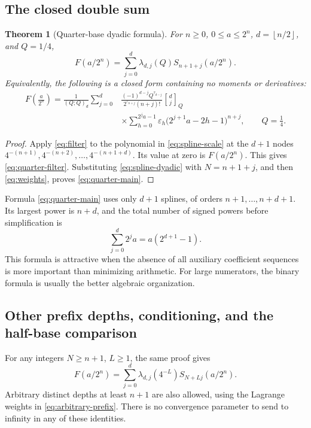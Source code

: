 \documentclass[11pt,a4paper]{article}
\newtheorem{theorem}{Theorem}[section]
\theoremstyle{definition}
\theoremstyle{remark}
\newcommand{\eps}{\varepsilon}
\newcommand{\qbinom}[3]{\genfrac{[}{]}{0pt}{}{#1}{#2}_{#3}}
\newcommand{\floor}[1]{\left\lfloor #1\right\rfloor}
\begin{document}
\subsection{The closed double sum}
\begin{theorem}[Quarter-base dyadic formula]
For \(n\geq0\), \(0\leq a\leq2^n\), \(d=\floor{n/2}\), and \(Q=1/4\),
\begin{equation}
 F(a/2^n)=\sum_{j=0}^{d}\lambda_{d,j}(Q)
                     S_{n+1+j}(a/2^n).                 \label{eq:quarter-filter}
\end{equation}
Equivalently, the following is a closed form containing no moments or derivatives:
\begin{equation}
 \boxed{\begin{aligned}
 F\!\left(\frac a{2^n}\right)
 =\frac1{(Q;Q)_d}\sum_{j=0}^{d}
 &\frac{(-1)^{d-j}Q^{\tau_{d-j}}}{2^{\tau_{n+j}}(n+j)!}
       \qbinom{d}{j}{Q}\\[-0.2em]
 &\times\sum_{h=0}^{2^j a-1}\eps_h
                \bigl(2^{j+1}a-2h-1\bigr)^{n+j},
 \qquad Q=\frac14.
 \end{aligned}}                                               \label{eq:quarter-main}
\end{equation}
\end{theorem}
\begin{proof}
Apply \eqref{eq:filter} to the polynomial in \eqref{eq:spline-scale} at the
\(d+1\) nodes \(4^{-(n+1)},4^{-(n+2)},\ldots,4^{-(n+1+d)}\).
Its value at zero is \(F(a/2^n)\).  This gives \eqref{eq:quarter-filter}.
Substituting \eqref{eq:spline-dyadic} with \(N=n+1+j\), and then
\eqref{eq:weights}, proves \eqref{eq:quarter-main}.
\end{proof}

Formula \eqref{eq:quarter-main} uses only \(d+1\) splines, of orders
\(n+1,\ldots,n+d+1\).  Its largest power is \(n+d\), and the total number of
signed powers before simplification is
\begin{equation}
 \sum_{j=0}^{d}2^ja=a(2^{d+1}-1).                        \label{eq:spline-count}
\end{equation}
This formula is attractive when the absence of all auxiliary coefficient sequences
is more important than minimizing arithmetic.  For large numerators, the binary
formula is usually the better algebraic organization.

\subsection{Other prefix depths, conditioning, and the half-base comparison}
For any integers \(N\geq n+1\), \(L\geq1\), the same proof gives
\begin{equation}
 F(a/2^n)=\sum_{j=0}^{d}\lambda_{d,j}(4^{-L})
                         S_{N+Lj}(a/2^n).               \label{eq:spline-stride}
\end{equation}
Arbitrary distinct depths at least \(n+1\) are also allowed, using the
Lagrange weights in \eqref{eq:arbitrary-prefix}.  There is no convergence parameter
to send to infinity in any of these identities.
\end{document}
